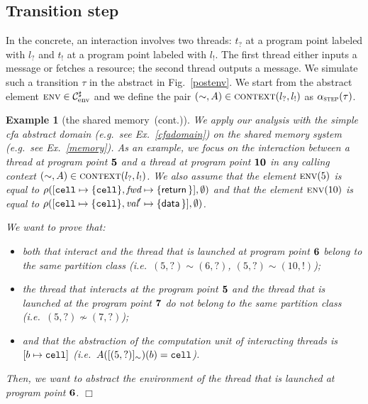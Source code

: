 \documentclass{article}
\newcommand{\boxexample}{$\Box$}
\newtheorem{example}[thm]{Example}
\newcommand{\rec}{?}
\newcommand{\eme}{!}
\newcommand{\pp}[1]{$\bf{#1}$}
\newcommand{\internal}[1]{\textnormal{\texttt{#1}}}
\newcommand{\data}[1]{\textsf{#1}\,}
\newcommand{\variable}[1]{\textit{#1}}
\newcommand{\cdata}{\data{data}}
\newcommand{\addread}{\data{return}}
\newcommand{\port}{\variable{fwd}}
\newcommand{\ccell}{\internal{cell}}
\newcommand{\datawrite}{\variable{val}'}
\newcommand{\memlabe}{5}
\newcommand{\memlabf}{6}
\newcommand{\memlabg}{7}
\newcommand{\memlabj}{10}
\newcommand{\lrec}{l_{\rec}}
\newcommand{\leme}{l_{\eme}}
\newcommand{\trec}{t_{\rec}}
\newcommand{\teme}{t_{\eme}}
\newcommand{\continued}{(cont.)}
\newcommand{\envf}{\textsc{env}}
\newcommand{\Envkey}{\mathrm{env}}
\newcommand{\Envdom}{\mathcal{C}^{\sharp}_{\Envkey}}
\newcommand{\shareanalysis}{the shared memory}
\newcommand{\cflowanalysis}{\shareanalysis\ \continued}
\begin{document}
\subsection{Transition step}
In the concrete, an interaction involves two threads: $\trec$ at a program point labeled with  $\lrec$  and $\teme$ at a program point labeled with $\leme$. 
The first thread either inputs a message or fetches a resource; 
the second thread outputs a message.
We simulate such a transition $\tau$ in the abstract in Fig.~\ref{postenv}. 
We start from the abstract element $\envf\in\Envdom$ and we define the pair $(\sim,A)\in\abstractcontext(\lrec,\leme)$ as $\alpha_{\textsc{step}}(\tau)$.

\begin{example}[\cflowanalysis]
We apply our analysis with the simple \emph{cfa} abstract domain (e.g.~see Ex.~\ref{cfadomain}) on the shared memory system (e.g.~see Ex.~\ref{memory}).
As an example, we focus on the interaction between a thread at program point \pp{\memlabe} and a thread at  program point \pp{\memlabj} in any calling context $(\sim,A)\in\abstractcontext(\lrec,\leme)$.
We also assume that the element 
$\envf(\memlabe)$ is equal to $\rho([\ccell \mapsto \{\ccell\}, \port\mapsto\{\addread\}],\emptyset)$ and 
that the  element $\envf(\memlabj)$ is equal to $\rho([\ccell \mapsto \{\ccell\}, \datawrite \mapsto \{\cdata\}],\emptyset)$.


We want to prove that:
\begin{itemize}
\item  both that interact and the thread that is launched at program point \pp{\memlabf} belong to the same partition class (i.e.~$(\memlabe,\rec)\sim (\memlabf,\rec)$, $(\memlabe,\rec)\sim(\memlabj,\eme)$);
\item the thread that interacts at the program point \pp{\memlabe} and the thread that is launched at the program point \pp{\memlabg} do not belong to the same partition class (i.e.~$(\memlabe,\rec)\not\sim(\memlabg,\rec)$);
\item  and that the abstraction of the computation unit of interacting threads is $[b\mapsto \ccell]$ (i.e.~$A([(\memlabe,\rec)]_\sim)(b)=\ccell$). 
\end{itemize}
Then, we want to abstract the environment of the thread that is launched at program point \pp{\memlabf}.
\boxexample\end{example}
\end{document}
